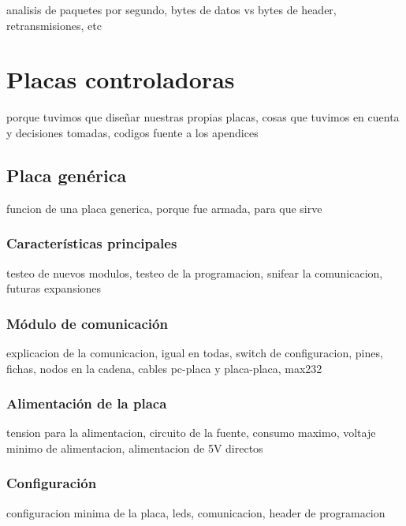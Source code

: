 analisis de paquetes por segundo, bytes de datos vs bytes de header, retransmisiones, etc

\section{Placas controladoras}
\label{h_placas}

porque tuvimos que diseñar nuestras propias placas, cosas que tuvimos en cuenta y decisiones tomadas, codigos fuente a los apendices

\subsection{Placa gen\'erica}
\label{h_placas_generica}

funcion de una placa generica, porque fue armada, para que sirve

\subsubsection{Caracter\'isticas principales}
\label{h_placas_generica_caracteristicas}

testeo de nuevos modulos, testeo de la programacion, snifear la comunicacion, futuras expansiones

\subsubsection{M\'odulo de comunicaci\'on}
\label{h_placas_generica_comm}

explicacion de la comunicacion, igual en todas, switch de configuracion, pines, fichas, nodos en la cadena, cables pc-placa y placa-placa, max232

\subsubsection{Alimentaci\'on de la placa}
\label{h_placas_generica_alimentacion}

tension para la alimentacion, circuito de la fuente, consumo maximo, voltaje minimo de alimentacion, alimentacion de 5V directos

\subsubsection{Configuraci\'on}
\label{h_placas_generica_config}

configuracion minima de la placa, leds, comunicacion, header de programacion

